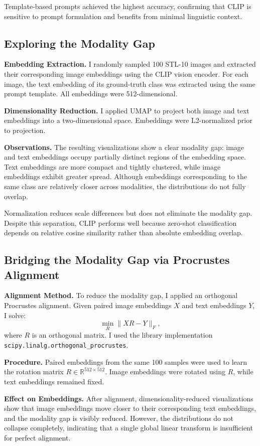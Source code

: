 \documentclass{article}
\begin{document}
Template-based prompts achieved the highest accuracy, confirming that CLIP is sensitive to prompt formulation and benefits from minimal linguistic context.

\subsection{Exploring the Modality Gap}

\textbf{Embedding Extraction.}  
I randomly sampled 100 STL-10 images and extracted their corresponding image embeddings using the CLIP vision encoder. For each image, the text embedding of its ground-truth class was extracted using the same prompt template. All embeddings were 512-dimensional.

\textbf{Dimensionality Reduction.}  
I applied UMAP to project both image and text embeddings into a two-dimensional space. Embeddings were L2-normalized prior to projection.

\textbf{Observations.}  
The resulting visualizations show a clear modality gap: image and text embeddings occupy partially distinct regions of the embedding space. Text embeddings are more compact and tightly clustered, while image embeddings exhibit greater spread. Although embeddings corresponding to the same class are relatively closer across modalities, the distributions do not fully overlap.

Normalization reduces scale differences but does not eliminate the modality gap. Despite this separation, CLIP performs well because zero-shot classification depends on relative cosine similarity rather than absolute embedding overlap.

\subsection{Bridging the Modality Gap via Procrustes Alignment}

\textbf{Alignment Method.}  
To reduce the modality gap, I applied an orthogonal Procrustes alignment. Given paired image embeddings $X$ and text embeddings $Y$, I solve:
\[
\min_{R} \|XR - Y\|_F,
\]
where $R$ is an orthogonal matrix. I used the library implementation \texttt{scipy.linalg.orthogonal\_procrustes}.

\textbf{Procedure.}  
Paired embeddings from the same 100 samples were used to learn the rotation matrix $R \in \mathbb{R}^{512 \times 512}$. Image embeddings were rotated using $R$, while text embeddings remained fixed.

\textbf{Effect on Embeddings.}  
After alignment, dimensionality-reduced visualizations show that image embeddings move closer to their corresponding text embeddings, and the modality gap is visibly reduced. However, the distributions do not collapse completely, indicating that a single global linear transform is insufficient for perfect alignment.
\end{document}
